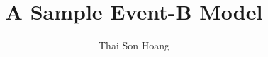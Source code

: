 \title{A Sample Event-B Model}
\author{Thai Son Hoang}



\maketitle


\begin{frame}
  \begin{center}
    \begin{Bdiagram}




    \end{Bdiagram}
  \end{center}
\end{frame}



